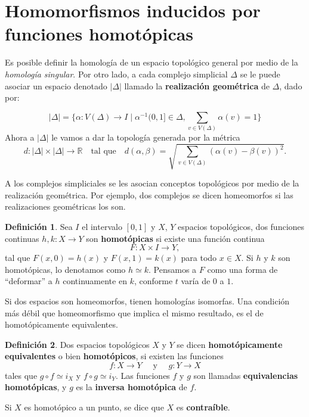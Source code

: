 \documentclass[12pt]{book}
\newtheorem{theorem}{Teorema}[section]
\theoremstyle{definition}
\newtheorem{definition}[theorem]{Definición}
\newcounter{in}
\newcounter{ini}
\begin{document}
\section{Homomorfismos inducidos por funciones homotópicas}

Es posible definir la homología de un espacio topológico general por
medio de la \emph{homología singular}. Por otro lado, a cada complejo
simplicial $\Delta$ se le puede asociar un espacio denotado $|\Delta|$
llamado la \textbf{realización geométrica} de $\Delta$, dado por:

$$|\Delta|=\{\alpha:V(\Delta)\rightarrow I\mid\alpha^{-1}(0,1]\in
\Delta, \sum _{v\in V(\Delta)}\alpha(v)=1\}$$
Ahora a $|\Delta|$ le vamos a dar la topología generada por la métrica
\begin{equation*}
  \label{metrica}
  d:|\Delta|\times |\Delta|\rightarrow  \mathbb{R} \quad \mbox{tal
    que}\quad d(\alpha,\beta)=\sqrt{\sum _{v\in V(\Delta)}(\alpha(v)-\beta(v))^{2}}.
\end{equation*}

A los complejos simpliciales se les asocian conceptos topológicos por
medio de la realización geométrica. Por ejemplo, dos complejos se
dicen homeomorfos si las realizaciones geométricas los son.

\begin{definition}
  Sea $I$ el intervalo $[0,1]$ y $X$, $Y$ espacios topológicos, dos funciones continuas
  $h,k:X\rightarrow Y$ son \textbf{homotópicas} si existe una función continua
  $$F:X\times I\rightarrow Y,$$
  tal que $F(x,0)=h(x)$ y $F(x,1)=k(x)$ para todo $x\in X.$ Si $h$ y
  $k$ son homotópicas, lo denotamos como $h\simeq k$. Pensamos a $F$
  como una forma de ``deformar'' a $h$ continuamente en $k$, conforme
  $t$ varía de $0$ a $1$.
\end{definition}


Si dos espacios son homeomorfos, tienen homologías isomorfas. Una
condición más débil que homeomorfismo que implica el mismo resultado,
es el de homotópicamente equivalentes.
 
\begin{definition}
  Dos espacios topológicos $X$ y $Y$ se dicen \textbf{homotópicamente
    equivalentes} o bien \textbf{homotópicos}, si existen las funciones
  $$f:X\rightarrow Y \quad \mbox{ y }\quad g:Y\rightarrow X$$
  tales que $g\circ f\simeq i_{X}$ y $f\circ g\simeq i_{Y}$. Las
  funciones $f$ y $g$ son llamadas\textbf{ equivalencias homotópicas},
  y $g$ es la \textbf{inversa homotópica} de $f$. 
\end{definition}
Si $X$ es homotópico a un punto, se dice que $X$ es
\textbf{contraíble}.
\end{document}
